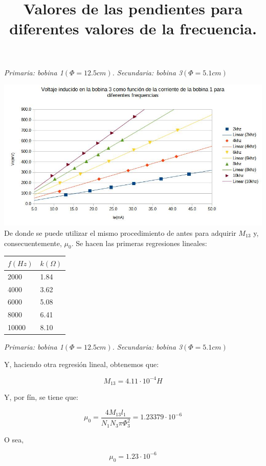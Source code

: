 \documentclass[a4paper,12pt]{article}
\begin{document}
\begin{center}
    \textit{Primaria: bobina 1$(\Phi = 12.5cm)$. Secundaria: bobina 3$(\Phi = 5.1cm)$}
\end{center}
\includegraphics[width=\textwidth]{G13.jpg}
De donde se puede utilizar el mismo procedimiento de antes para adquirir $M_{13}$ y, consecuentemente, $\mu_0$. Se hacen las primeras regresiones lineales:
\begin{table}[h!]
    \title{\textbf{Valores de las pendientes para diferentes valores de la frecuencia.}}
    \centering
    \begin{tabular}{|l|l|}
    \hline
        $f(Hz)$ & $k(\Omega)$\\\hline
        2000 & 1.84 \\ \hline
        4000 & 3.62 \\ \hline
        6000 & 5.08 \\ \hline
        8000 & 6.41 \\ \hline
        10000 & 8.10 \\ \hline
    \end{tabular}
\end{table}
\begin{center}
    \textit{Primaria: bobina 1$(\Phi = 12.5cm)$. Secundaria: bobina 3$(\Phi = 5.1cm)$}
\end{center}

Y, haciendo otra regresión lineal, obtenemos que:

$$M_{13} = 4.11 \cdot 10^{-4} H$$

Y, por fín, se tiene que:

$$\mu_0 = \frac{4 M_{13} l_1}{N_1 N_3  \pi \Phi_3^2} = 1.23379 \cdot 10^{-6}$$

O sea, 

\begin{tcolorbox}
    \begin{equation}
        \mu_0 = 1.23 \cdot 10^{-6}
    \end{equation}
\end{tcolorbox}
\end{document}
